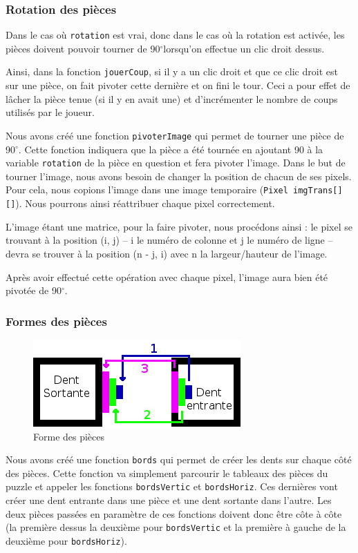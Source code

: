 \documentclass[]{article}
\newcommand{\variable}[1]{\noindent \texttt{#1}}
\newcommand{\degr}[0]{$^\circ$}
\begin{document}
\subsubsection{Rotation des pièces}

Dans le cas où \variable{rotation} est vrai, donc dans le cas où la rotation est activée, les pièces doivent pouvoir tourner de 90\degr lorsqu'on effectue un clic droit dessus.

Ainsi, dans la fonction \variable{jouerCoup}, si il y a un clic droit et que ce clic droit est sur une pièce, on fait pivoter cette dernière et on fini le tour. Ceci a pour effet de lâcher la pièce tenue (si il y en avait une) et d'incrémenter le nombre de coups utilisés par le joueur.

Nous avons créé une fonction \variable{pivoterImage} qui permet de tourner une pièce de 90\degr. Cette fonction indiquera que la pièce a été tournée en ajoutant 90 à la variable \variable{rotation} de la pièce en question et fera pivoter l'image. Dans le but de tourner l'image, nous avons besoin de changer la position de chacun de ses pixels. Pour cela, nous copions l'image dans une image temporaire (\variable{Pixel imgTrans[][]}). Nous pourrons ainsi réattribuer chaque pixel correctement.

L'image étant une matrice, pour la faire pivoter, nous procédons ainsi : le pixel se trouvant à la position (i, j) -- i le numéro de colonne et j le numéro de ligne -- devra se trouver à la position (n - j, i) avec n la largeur/hauteur de l'image.

Après avoir effectué cette opération avec chaque pixel, l'image aura bien été pivotée de 90\degr.

\subsubsection{Formes des pièces}

\begin{figure}[hpt]
	\center
	\caption{\label{Forme des pièces} Forme des pièces}
	\includegraphics{dents}
\end{figure}

Nous avons créé une fonction \variable{bords} qui permet de créer les dents sur chaque côté des pièces. Cette fonction va simplement parcourir le tableaux des pièces du puzzle et appeler les fonctions \variable{bordsVertic} et \variable{bordsHoriz}. Ces dernières vont créer une dent entrante dans une pièce et une dent sortante dans l'autre. Les deux pièces passées en paramètre de ces fonctions doivent donc être côte à côte (la première dessus la deuxième pour \variable{bordsVertic} et la première à gauche de la deuxième pour \variable{bordsHoriz}).
\end{document}
